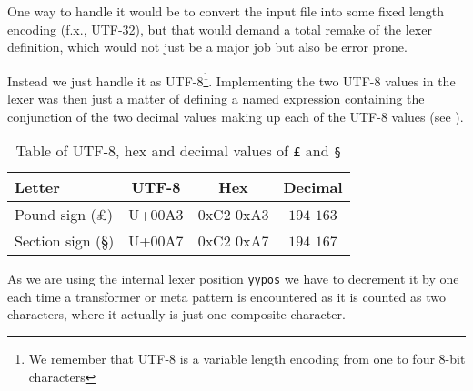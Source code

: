 One way to handle it would be to convert the input file into some fixed length
encoding (f.x., UTF-32), but that would demand a total remake of the lexer
definition, which would not just be a major job but also be error prone.

Instead we just handle it as UTF-8\footnote{We remember that UTF-8 is a variable
  length encoding from one to four 8-bit characters}. Implementing the two
UTF-8 values in the lexer was then just a matter of defining a named expression
containing the conjunction of the two decimal values making up each of the UTF-8
values (see ).

\begin{table}
  \centering
  \begin{tabular}{|l|c|c|c|}
    \hline
    \textbf{Letter} & \textbf{UTF-8} & \textbf{Hex} & \textbf{Decimal} \\ \hline
    Pound sign (£)   & U+00A3 & 0xC2 0xA3 &  $194$ $163$ \\ \hline
    Section sign (§) & U+00A7 & 0xC2 0xA7 & $194$ $167$ \\ \hline
  \end{tabular}

  \caption{Table of UTF-8, hex and decimal values of \texttt{£} and \texttt{§}}
  \label{tab:utf8-rule-values}
\end{table}

As we are using the internal lexer position \texttt{yypos} we have to decrement
it by one each time a transformer or meta pattern is encountered as it is
counted as two characters, where it actually is just one composite character.



